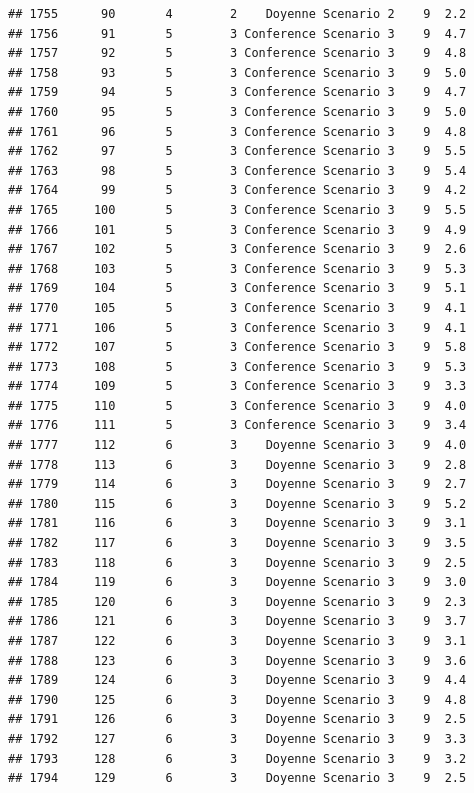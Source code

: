 \documentclass[
]{article}
\begin{document}
\begin{verbatim}
## 1755      90       4        2    Doyenne Scenario 2    9  2.2
## 1756      91       5        3 Conference Scenario 3    9  4.7
## 1757      92       5        3 Conference Scenario 3    9  4.8
## 1758      93       5        3 Conference Scenario 3    9  5.0
## 1759      94       5        3 Conference Scenario 3    9  4.7
## 1760      95       5        3 Conference Scenario 3    9  5.0
## 1761      96       5        3 Conference Scenario 3    9  4.8
## 1762      97       5        3 Conference Scenario 3    9  5.5
## 1763      98       5        3 Conference Scenario 3    9  5.4
## 1764      99       5        3 Conference Scenario 3    9  4.2
## 1765     100       5        3 Conference Scenario 3    9  5.5
## 1766     101       5        3 Conference Scenario 3    9  4.9
## 1767     102       5        3 Conference Scenario 3    9  2.6
## 1768     103       5        3 Conference Scenario 3    9  5.3
## 1769     104       5        3 Conference Scenario 3    9  5.1
## 1770     105       5        3 Conference Scenario 3    9  4.1
## 1771     106       5        3 Conference Scenario 3    9  4.1
## 1772     107       5        3 Conference Scenario 3    9  5.8
## 1773     108       5        3 Conference Scenario 3    9  5.3
## 1774     109       5        3 Conference Scenario 3    9  3.3
## 1775     110       5        3 Conference Scenario 3    9  4.0
## 1776     111       5        3 Conference Scenario 3    9  3.4
## 1777     112       6        3    Doyenne Scenario 3    9  4.0
## 1778     113       6        3    Doyenne Scenario 3    9  2.8
## 1779     114       6        3    Doyenne Scenario 3    9  2.7
## 1780     115       6        3    Doyenne Scenario 3    9  5.2
## 1781     116       6        3    Doyenne Scenario 3    9  3.1
## 1782     117       6        3    Doyenne Scenario 3    9  3.5
## 1783     118       6        3    Doyenne Scenario 3    9  2.5
## 1784     119       6        3    Doyenne Scenario 3    9  3.0
## 1785     120       6        3    Doyenne Scenario 3    9  2.3
## 1786     121       6        3    Doyenne Scenario 3    9  3.7
## 1787     122       6        3    Doyenne Scenario 3    9  3.1
## 1788     123       6        3    Doyenne Scenario 3    9  3.6
## 1789     124       6        3    Doyenne Scenario 3    9  4.4
## 1790     125       6        3    Doyenne Scenario 3    9  4.8
## 1791     126       6        3    Doyenne Scenario 3    9  2.5
## 1792     127       6        3    Doyenne Scenario 3    9  3.3
## 1793     128       6        3    Doyenne Scenario 3    9  3.2
## 1794     129       6        3    Doyenne Scenario 3    9  2.5

\end{verbatim}
\end{document}
